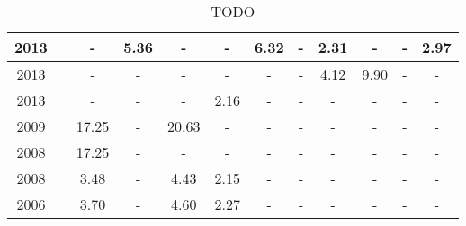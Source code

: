 \begin{sidewaystable}
\begin{tabular}{c|l|c|c|c|c|c|c|c|c|c|c}
    2013 & {\cite{brasil2013multiobjective}} & -     & 5.36  & -     & -    & 6.32  & -    & 2.31 & -     & -     & 2.97 \\ \hline
    2013 & {\cite{dorn2013knowledge}}        & -     & -     & -     & -    & -     & -    & 4.12 & 9.90  & -     & -    \\ \hline
    2013 & {\cite{venske2013multiobjective}} & -     & -     & -     & 2.16 & -     & -    & -    & -     & -     & -    \\ \hline
    2009 & {\cite{mansour2009scatter}}       & 17.25 & -     & 20.63 & -    & -     & -    & -    & -     & -     & -    \\ \hline
    2008 & {\cite{kehyayan2008evolutionary}} & 17.25 & -     & -     & -    & -     & -    & -    & -     & -     & -    \\ \hline
    2008 & {\cite{judy2009multi}}            & 3.48  & -     & 4.43  & 2.15 & -     & -    & -    & -     & -     & -    \\ \hline
    2006 & {\cite{cutello2005multi}}         & 3.70  & -     & 4.60  & 2.27 & -     & -    & -    & -     & -     & -    \\ \hline
  \end{tabular}
  \caption{TODO}
  \label{tab:best-rmsd-ffa}
\end{sidewaystable}
